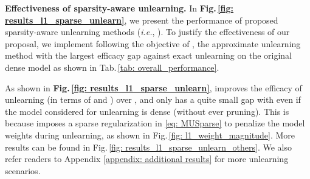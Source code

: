 {\noindent \textbf{{Effectiveness of sparsity-aware unlearning.}}
\iffalse
In  \textbf{Fig.\,\ref{fig: results_l1_sparse_unlearn}},
we present the performance of proposed sparsity-aware unlearning methods (\textit{i.e.}, {\MUSparse}). 
To justify the effectiveness of our proposal, we implement  {\MUSparse} following the objective of {\FT},  the approximate unlearning method with the largest efficacy gap against exact unlearning on the original dense model as shown in Tab.\,\ref{tab: overall_performance}.



As shown in \textbf{Fig.\,\ref{fig: results_l1_sparse_unlearn}}, {\MUSparse} improves the efficacy of unlearning (in terms of {\UA} and {\MIAF}) over {\IU}, and only has a quite small gap with {\retrain}  even if  the model considered for unlearning  is dense (without ever pruning). 
 This is because {\MUSparse} imposes a sparse regularization in  \eqref{eq: MUSparse} to penalize the model weights during unlearning, as shown in Fig.\,\ref{fig: l1_weight_magnitude}.
More results 
can be found in Fig.\,\ref{fig: results_l1_sparse_unlearn_others}. We also refer readers to Appendix \ref{appendix: additional results} for more unlearning scenarios. 



}
